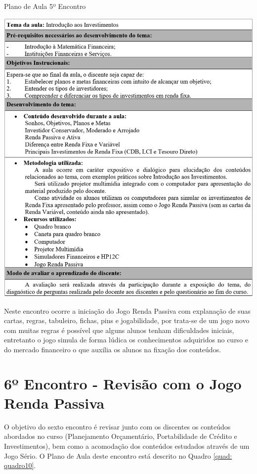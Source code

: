 \graphicspath{{quadros/}} 
\begin{quadro}[!ht]
\centering
\begin{minipage}{1.\textwidth}
\caption{Plano de Aula 5º Encontro}
\centering
\includegraphics[width=1.0\textwidth]{quadro-9_plano-aula-5}
\label{quad: quadro09}
\end{minipage}
\end{quadro}

Neste encontro ocorre a iniciação do Jogo Renda Passiva com explanação de suas cartas, regras, tabuleiro, fichas, pins e jogabilidade, por trata-se de um jogo novo com muitas regras é possível que alguns alunos tenham dificuldades iniciais, entretanto o jogo simula de forma lúdica os conhecimentos adquiridos no curso e do mercado financeiro o que auxilia os alunos na fixação dos conteúdos.

\section{6º Encontro - Revisão com o Jogo Renda Passiva}
O objetivo do sexto encontro é revisar junto com os discentes os conteúdos abordados no curso (Planejamento Orçamentário, Portabilidade de Crédito e Investimentos), bem como a acomodação dos conteúdos estudados através de um Jogo Sério. O Plano de Aula deste encontro está descrito no Quadro \ref{quad: quadro10}.


